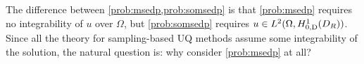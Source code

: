%
%

\label{rem:whyone}

The difference between \cref{prob:msedp,prob:somsedp} is that \cref{prob:msedp} requires no integrability of $u$ over $\Omega$, but \cref{prob:somsedp} requires $u \in \LtOHozDDRnormal$. Since all the theory for sampling-based UQ methods assume some integrability of the solution, the natural question is: why consider \cref{prob:msedp} at all?

